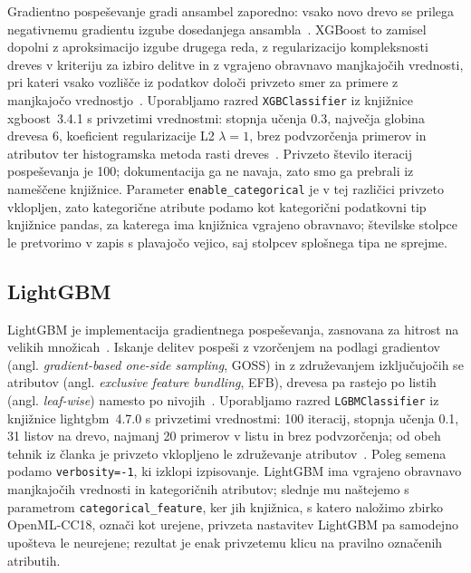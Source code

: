 \documentclass[a4paper,12pt,openright]{book}
\begin{document}
Gradientno pospeševanje gradi ansambel zaporedno: vsako novo drevo se prilega
negativnemu gradientu izgube dosedanjega ansambla~\cite{friedman2001greedy}.
XGBoost to zamisel dopolni z aproksimacijo izgube drugega reda, z regularizacijo
kompleksnosti dreves v kriteriju za izbiro delitve in z vgrajeno obravnavo
manjkajočih vrednosti, pri kateri vsako vozlišče iz podatkov določi privzeto
smer za primere z manjkajočo vrednostjo~\cite{chen2016xgboost}. Uporabljamo
razred \texttt{XGBClassifier} iz knjižnice xgboost~3.4.1 s privzetimi
vrednostmi: stopnja učenja \num{0.3}, največja globina drevesa 6, koeficient
regularizacije L2 $\lambda = 1$, brez podvzorčenja primerov in atributov ter
histogramska metoda rasti dreves~\cite{xgboostdocs}. Privzeto število iteracij
pospeševanja je 100; dokumentacija ga ne navaja, zato smo ga prebrali iz
nameščene knjižnice. Parameter
\texttt{enable\_categorical} je v tej različici privzeto vklopljen, zato
kategorične atribute podamo kot kategorični podatkovni tip knjižnice pandas, za
katerega ima knjižnica vgrajeno obravnavo; številske stolpce le pretvorimo v zapis s
plavajočo vejico, saj stolpcev splošnega tipa ne sprejme.

\subsection{LightGBM}
\label{sec:lightgbm}

LightGBM je implementacija gradientnega pospeševanja, zasnovana za hitrost na
velikih množicah~\cite{ke2017lightgbm}. Iskanje delitev pospeši z vzorčenjem na
podlagi gradientov (angl. \emph{gradient-based one-side sampling}, GOSS) in z
združevanjem izključujočih se atributov (angl. \emph{exclusive feature
bundling}, EFB), drevesa pa rastejo po listih (angl. \emph{leaf-wise}) namesto
po nivojih~\cite{ke2017lightgbm}.
Uporabljamo razred \texttt{LGBMClassifier} iz knjižnice lightgbm~4.7.0 s
privzetimi vrednostmi: 100 iteracij, stopnja učenja \num{0.1}, 31 listov na
drevo, najmanj 20 primerov v listu in brez podvzorčenja; od obeh tehnik iz
članka je privzeto vklopljeno le združevanje atributov~\cite{lightgbmdocs}.
Poleg semena podamo \texttt{verbosity=-1}, ki izklopi izpisovanje. LightGBM ima
vgrajeno obravnavo manjkajočih vrednosti in kategoričnih atributov; slednje mu
naštejemo s parametrom \texttt{categorical\_feature}, ker jih
knjižnica, s katero naložimo zbirko OpenML-CC18, označi kot urejene, privzeta
nastavitev LightGBM pa samodejno upošteva le neurejene; rezultat je enak
privzetemu klicu na pravilno označenih atributih.
\end{document}
